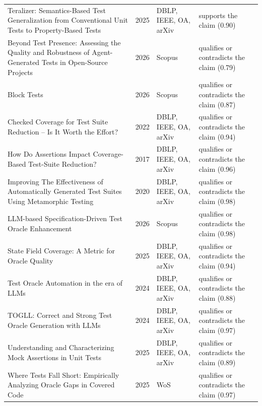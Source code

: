 \begin{longtable}{@{}%
  >{\raggedright\arraybackslash}p{}c%
  >{\raggedright\arraybackslash}p{}%
  >{\raggedright\arraybackslash}p{}@{}}
Teralizer: Semantics-Based Test Generalization from Conventional Unit Tests to Property-Based Tests & 2025 & DBLP, IEEE, OA, arXiv & supports the claim (0.90) \\
Beyond Test Presence: Assessing the Quality and Robustness of Agent-Generated Tests in Open-Source Projects & 2026 & Scopus & qualifies or contradicts the claim (0.79) \\
Block Tests & 2026 & Scopus & qualifies or contradicts the claim (0.87) \\
Checked Coverage for Test Suite Reduction -- Is It Worth the Effort? & 2022 & DBLP, IEEE, OA, arXiv & qualifies or contradicts the claim (0.94) \\
How Do Assertions Impact Coverage-Based Test-Suite Reduction? & 2017 & DBLP, IEEE, OA, arXiv & qualifies or contradicts the claim (0.96) \\
Improving The Effectiveness of Automatically Generated Test Suites Using Metamorphic Testing & 2020 & DBLP, IEEE, OA, arXiv & qualifies or contradicts the claim (0.98) \\
LLM-based Specification-Driven Test Oracle Enhancement & 2026 & Scopus & qualifies or contradicts the claim (0.98) \\
State Field Coverage: A Metric for Oracle Quality & 2025 & DBLP, IEEE, OA, arXiv & qualifies or contradicts the claim (0.94) \\
Test Oracle Automation in the era of LLMs & 2024 & DBLP, IEEE, OA, arXiv & qualifies or contradicts the claim (0.88) \\
TOGLL: Correct and Strong Test Oracle Generation with LLMs & 2024 & DBLP, IEEE, OA, arXiv & qualifies or contradicts the claim (0.97) \\
Understanding and Characterizing Mock Assertions in Unit Tests & 2025 & DBLP, IEEE, OA, arXiv & qualifies or contradicts the claim (0.89) \\
Where Tests Fall Short: Empirically Analyzing Oracle Gaps in Covered Code & 2025 & WoS & qualifies or contradicts the claim (0.97) \\
\end{longtable}
\endgroup
